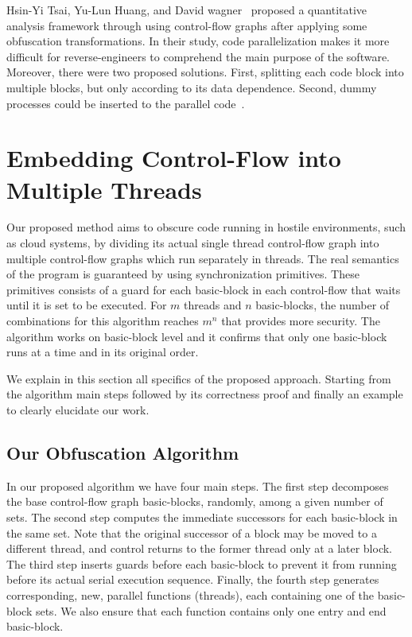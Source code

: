 \documentclass[3p,times,procedia,twocolumn,letterpaper]{elsarticle}
\begin{document}
Hsin-Yi Tsai, Yu-Lun Huang, and David wagner~\cite{r} proposed a quantitative analysis framework through using control-flow graphs after applying some obfuscation transformations. In their study, code parallelization makes it more difficult for reverse-engineers to comprehend the main purpose of the software. Moreover, there were two proposed solutions. First, splitting each code block into multiple blocks, but only according to its data dependence. Second, dummy processes could be inserted to the parallel code~\cite{d}. 



\section{Embedding Control-Flow into Multiple Threads}
\label{method}
Our proposed method aims to obscure code running in hostile environments, such as cloud systems, by
dividing its actual single thread control-flow graph into multiple
control-flow graphs which run separately in threads. The real semantics
of the program is guaranteed by using synchronization
primitives. These primitives consists of a guard for each basic-block
in each control-flow that waits until it is set to be executed. For
$m$ threads and $n$ basic-blocks, the number of combinations for this
algorithm reaches $m^n$ that provides more security. The algorithm
works on basic-block level and it confirms that only one basic-block
runs at a time and in its original order.


We explain in this section all specifics of the proposed approach. Starting from the algorithm main steps followed by its correctness proof and finally an example to clearly elucidate our work.

\subsection{Our Obfuscation Algorithm}
In our proposed algorithm we have four main steps. The first step decomposes the base control-flow graph basic-blocks, randomly, among a given number of sets. The second  step computes the immediate successors for each basic-block in the same set. Note that the original successor of a block may be moved to a different thread, and control returns to the former thread only at a later block. The third step inserts guards before each basic-block to prevent it from running before its actual serial execution sequence. Finally, the fourth step  generates corresponding, new, parallel functions (threads), each containing one of the basic-block sets. We also ensure that each function contains only one entry and end basic-block. 
\end{document}
